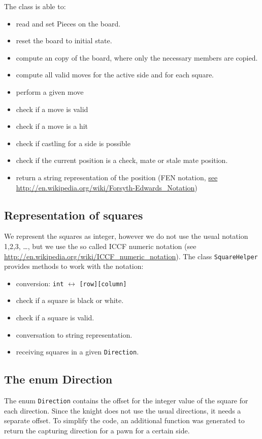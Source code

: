 \documentclass [12pt ,a4paper, naustrian]{scrartcl}
\theoremstyle{plain}
\theoremstyle{definition}
\theoremstyle{remark}
\begin{document}
		The class is able to:
		\begin{itemize}
			\item read and set Pieces on the board.
			\item reset the board to initial state. 
			\item compute an copy of the board, where only the necessary members are copied.
			\item compute all valid moves for the active side and for each square.
			\item perform a given move
			\item check if a move is valid
			\item check if a move is a hit
			\item check if castling for a side is possible
			\item check if the current position is a check, mate or stale mate position.
			\item return a string representation of the position (FEN notation, \url{see http://en.wikipedia.org/wiki/Forsyth-Edwards_Notation})
			
		\end{itemize}
		
	\subsection{Representation of squares}
	\label{sec:squares}
	We represent the squares as integer, however we do not use the usual notation 1,2,3, \ldots , but we use the so called ICCF numeric notation (see \url{http://en.wikipedia.org/wiki/ICCF_numeric_notation}). The class \verb+SquareHelper+ provides methods to work with the notation:
	\begin{itemize}
		\item conversion: \verb+int+ $\leftrightarrow$ \verb+[row][column]+
		\item check if a square is black or white.
		\item check if a square is valid.
		\item conversation to string representation.
		\item receiving squares in a given \verb+Direction+.
	\end{itemize}
		
	\subsection{The enum Direction}
		The enum \verb+Direction+ contains the offset for the integer value of the square for each direction. Since the knight does not use the usual directions, it needs a separate offset. To simplify the code, an additional function was generated to return the capturing direction for a pawn for a certain side.
\end{document}

